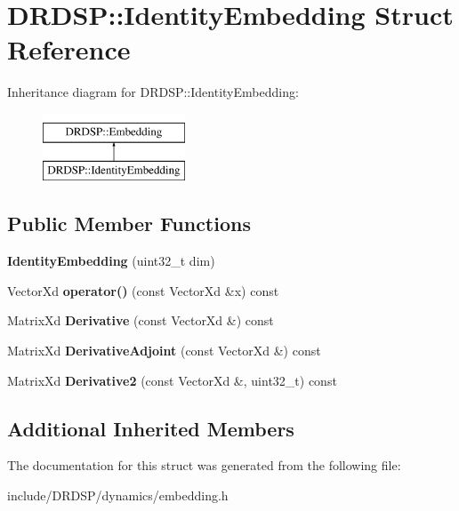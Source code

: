 \hypertarget{struct_d_r_d_s_p_1_1_identity_embedding}{\section{D\-R\-D\-S\-P\-:\-:Identity\-Embedding Struct Reference}
\label{struct_d_r_d_s_p_1_1_identity_embedding}
}
Inheritance diagram for D\-R\-D\-S\-P\-:\-:Identity\-Embedding\-:\begin{figure}[H]
\begin{center}
\leavevmode
\includegraphics[height=2.000000cm]{struct_d_r_d_s_p_1_1_identity_embedding}
\end{center}
\end{figure}
\subsection*{Public Member Functions}
\begin{DoxyCompactItemize}
\item 
\hypertarget{struct_d_r_d_s_p_1_1_identity_embedding_ab0e013dd16519f519ba32f38f1e743a3}{{\bfseries Identity\-Embedding} (uint32\-\_\-t dim)}\label{struct_d_r_d_s_p_1_1_identity_embedding_ab0e013dd16519f519ba32f38f1e743a3}

\item 
\hypertarget{struct_d_r_d_s_p_1_1_identity_embedding_aaed08501ed449445888d8e8776c69f4f}{Vector\-Xd {\bfseries operator()} (const Vector\-Xd \&x) const }\label{struct_d_r_d_s_p_1_1_identity_embedding_aaed08501ed449445888d8e8776c69f4f}

\item 
\hypertarget{struct_d_r_d_s_p_1_1_identity_embedding_a41bad0cd08f274f78412a31e0fb6854e}{Matrix\-Xd {\bfseries Derivative} (const Vector\-Xd \&) const }\label{struct_d_r_d_s_p_1_1_identity_embedding_a41bad0cd08f274f78412a31e0fb6854e}

\item 
\hypertarget{struct_d_r_d_s_p_1_1_identity_embedding_a836b4855538770d5f2d40e2c294c5b88}{Matrix\-Xd {\bfseries Derivative\-Adjoint} (const Vector\-Xd \&) const }\label{struct_d_r_d_s_p_1_1_identity_embedding_a836b4855538770d5f2d40e2c294c5b88}

\item 
\hypertarget{struct_d_r_d_s_p_1_1_identity_embedding_a62a97e69aa9aa28c5d4f3dc60cb5359e}{Matrix\-Xd {\bfseries Derivative2} (const Vector\-Xd \&, uint32\-\_\-t) const }\label{struct_d_r_d_s_p_1_1_identity_embedding_a62a97e69aa9aa28c5d4f3dc60cb5359e}

\end{DoxyCompactItemize}
\subsection*{Additional Inherited Members}


The documentation for this struct was generated from the following file\-:\begin{DoxyCompactItemize}
\item 
include/\-D\-R\-D\-S\-P/dynamics/embedding.\-h\end{DoxyCompactItemize}
